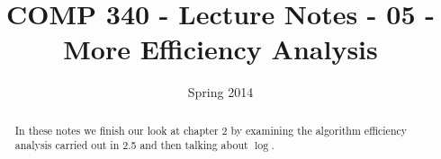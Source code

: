 \documentclass[]{tufte-handout}
\title{COMP 340 - Lecture Notes - 05 - More Efficiency Analysis}
\date{Spring 2014}
\begin{document}
\maketitle

\begin{abstract}
In these notes we finish our look at chapter 2 by examining the algorithm efficiency analysis carried out in 2.5 and then talking about $\log$.
\end{abstract}
\end{document}
